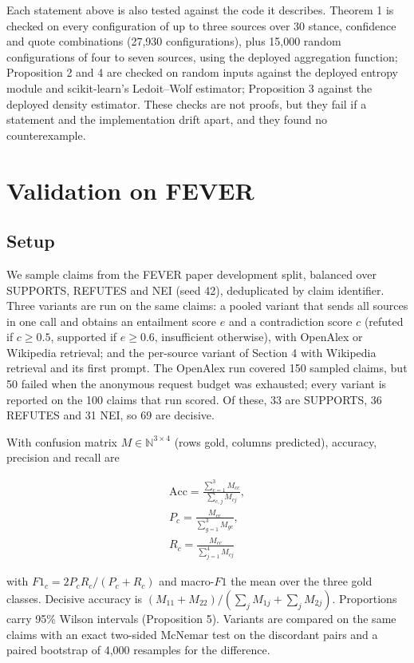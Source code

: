 \documentclass[11pt,a4paper]{article}
\begin{document}
Each statement above is also tested against the code it describes. Theorem 1 is checked on every configuration of up to three sources over 30 stance, confidence and quote combinations (27,930 configurations), plus 15,000 random configurations of four to seven sources, using the deployed aggregation function; Proposition 2 and 4 are checked on random inputs against the deployed entropy module and scikit-learn's Ledoit--Wolf estimator; Proposition 3 against the deployed density estimator. These checks are not proofs, but they fail if a statement and the implementation drift apart, and they found no counterexample.

\section{Validation on FEVER}

\subsection{Setup}

We sample claims from the FEVER paper development split, balanced over SUPPORTS, REFUTES and NEI (seed 42), deduplicated by claim identifier. Three variants are run on the same claims: a pooled variant that sends all sources in one call and obtains an entailment score $e$ and a contradiction score $c$ (refuted if $c \ge 0.5$, supported if $e \ge 0.6$, insufficient otherwise), with OpenAlex or Wikipedia retrieval; and the per-source variant of Section 4 with Wikipedia retrieval and its first prompt. The OpenAlex run covered 150 sampled claims, but 50 failed when the anonymous request budget was exhausted; every variant is reported on the 100 claims that run scored. Of these, 33 are SUPPORTS, 36 REFUTES and 31 NEI, so 69 are decisive.

With confusion matrix $M \in \mathbb{N}^{3 \times 4}$ (rows gold, columns predicted), accuracy, precision and recall are

\begin{equation}
\begin{aligned}
\mathrm{Acc} = \frac{\sum_{c=1}^{3} M_{cc}}{\sum_{c,j} M_{cj}}, \\
P_c = \frac{M_{cc}}{\sum_{g=1}^{3} M_{gc}}, \\
R_c = \frac{M_{cc}}{\sum_{j=1}^{4} M_{cj}}
\end{aligned}
\end{equation}

with $F1_c = 2P_cR_c/(P_c+R_c)$ and macro-$F1$ the mean over the three gold classes. Decisive accuracy is $(M_{11}+M_{22})/(\sum_j M_{1j} + \sum_j M_{2j})$. Proportions carry 95\% Wilson intervals (Proposition 5). Variants are compared on the same claims with an exact two-sided McNemar test on the discordant pairs and a paired bootstrap of 4,000 resamples for the difference.
\end{document}
